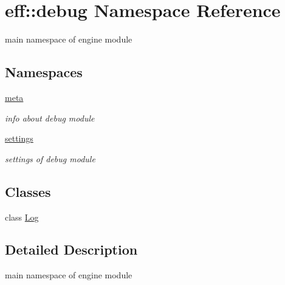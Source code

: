 \hypertarget{namespaceeff_1_1debug}{}\section{eff\+:\+:debug Namespace Reference}
\label{namespaceeff_1_1debug}


main namespace of engine module  


\subsection*{Namespaces}
\begin{DoxyCompactItemize}
\item 
 \hyperlink{namespaceeff_1_1debug_1_1meta}{meta}
\begin{DoxyCompactList}\small\item\em info about debug module \end{DoxyCompactList}\item 
 \hyperlink{namespaceeff_1_1debug_1_1settings}{settings}
\begin{DoxyCompactList}\small\item\em settings of debug module \end{DoxyCompactList}\end{DoxyCompactItemize}
\subsection*{Classes}
\begin{DoxyCompactItemize}
\item 
class \hyperlink{classeff_1_1debug_1_1Log}{Log}
\end{DoxyCompactItemize}


\subsection{Detailed Description}
main namespace of engine module 